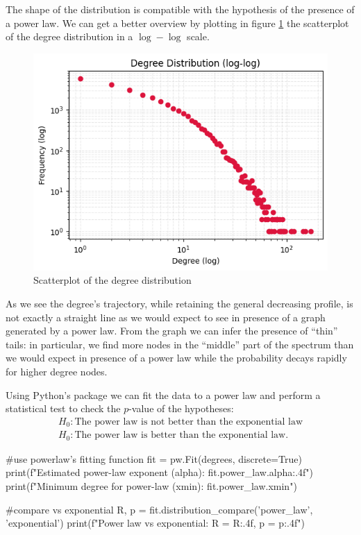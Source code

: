 \documentclass[12pt]{article}
\begin{document}
The shape of the distribution is compatible with the hypothesis of the presence of a power law. We can get a better overview by plotting in figure \ref{fig:screenshot003} the scatterplot of the degree distribution in a $\log-\log$ scale.
\begin{figure}[h]
	\centering
	\includegraphics[width=0.6\linewidth]{screenshot003}
	\caption{Scatterplot of the degree distribution}
	\label{fig:screenshot003}
\end{figure}
As we see the degree's trajectory, while retaining the general decreasing profile, is not exactly a straight line as we would expect to see in presence of a graph generated by a power law. From the graph we can infer the presence of ``thin'' tails: in particular, we find more nodes in the ``middle'' part of the spectrum than we would expect in presence of a power law while the probability decays rapidly for higher degree nodes.\par
Using Python's package  we can fit the data to a power law and perform a statistical test to check the $p$-value of the hypotheses:
\begin{equation*}
	\begin{array}{l}
		H_{0}:\text{The power law is not better than the exponential law}\\
		 H_{0}:\text{The power law is better than the exponential law}.
	\end{array}
\end{equation*}
\begin{py}
	#use powerlaw's fitting function
	fit = pw.Fit(degrees, discrete=True)
	print(f"Estimated power-law exponent (alpha): {fit.power_law.alpha:.4f}")
	print(f"Minimum degree for power-law (xmin): {fit.power_law.xmin}")
	
	#compare vs exponential
	R, p = fit.distribution_compare('power_law', 'exponential')
	print(f"Power law vs exponential: R = {R:.4f}, p = {p:.4f}")
\end{py}
\end{document}
